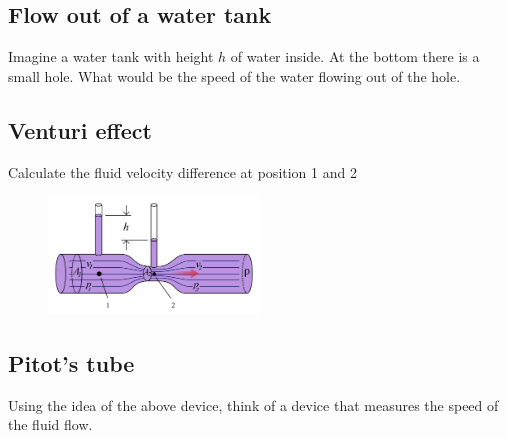 \documentclass[11pt,letterpaper]{article}
\begin{document}
\subsection{Flow out of a water tank}
Imagine a water tank with height $h$ of water inside. At the bottom there is a small hole. What would be the speed of the water flowing out of the hole.

\subsection{Venturi effect}
Calculate the fluid velocity difference at position 1 and 2
\begin{figure}[H]
    \centering
    \includegraphics[width=0.5\textwidth]{figs/Venturi_wiki}
\end{figure}

\subsection{Pitot's tube}
Using the idea of the above device, think of a device that measures the speed of the fluid flow.

\newpage
\end{document}

